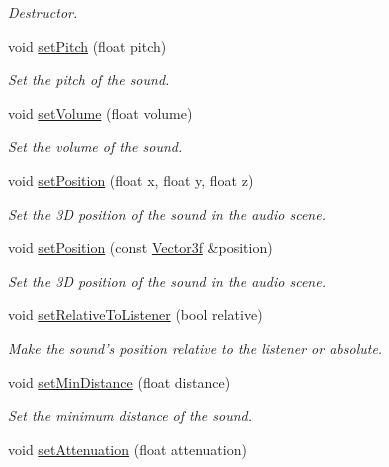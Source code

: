 \begin{DoxyCompactItemize}
\begin{DoxyCompactList}\small\item\em Destructor. \end{DoxyCompactList}\item 
void \hyperlink{classsf_1_1_sound_source_a72a13695ed48b7f7b55e7cd4431f4bb6}{set\+Pitch} (float pitch)
\begin{DoxyCompactList}\small\item\em Set the pitch of the sound. \end{DoxyCompactList}\item 
void \hyperlink{classsf_1_1_sound_source_a2f192f2b49fb8e2b82f3498d3663fcc2}{set\+Volume} (float volume)
\begin{DoxyCompactList}\small\item\em Set the volume of the sound. \end{DoxyCompactList}\item 
void \hyperlink{classsf_1_1_sound_source_a0480257ea25d986eba6cc3c1a6f8d7c2}{set\+Position} (float x, float y, float z)
\begin{DoxyCompactList}\small\item\em Set the 3\+D position of the sound in the audio scene. \end{DoxyCompactList}\item 
void \hyperlink{classsf_1_1_sound_source_a17ba9ed01925395652181a7b2a7d3aef}{set\+Position} (const \hyperlink{classsf_1_1_vector3}{Vector3f} \&position)
\begin{DoxyCompactList}\small\item\em Set the 3\+D position of the sound in the audio scene. \end{DoxyCompactList}\item 
void \hyperlink{classsf_1_1_sound_source_ac478a8b813faf7dd575635b102081d0d}{set\+Relative\+To\+Listener} (bool relative)
\begin{DoxyCompactList}\small\item\em Make the sound's position relative to the listener or absolute. \end{DoxyCompactList}\item 
void \hyperlink{classsf_1_1_sound_source_a75bbc2c34addc8b25a14edb908508afe}{set\+Min\+Distance} (float distance)
\begin{DoxyCompactList}\small\item\em Set the minimum distance of the sound. \end{DoxyCompactList}\item 
void \hyperlink{classsf_1_1_sound_source_aa2adff44cd2f8b4e3c7315d7c2a45626}{set\+Attenuation} (float attenuation)

\end{DoxyCompactItemize}
